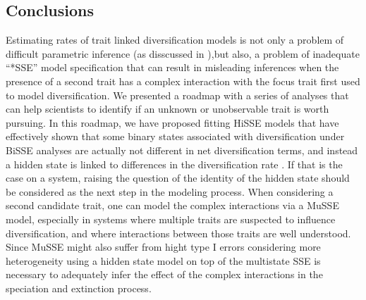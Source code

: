 %


\bigskip

\subsection*{Conclusions}

Estimating rates of trait linked diversification models is not only a problem of difficult parametric inference (as disscussed in  \citet{rabosky_2010, beaulieu_2015}),but also, a problem of inadequate  ``*SSE'' model specification that can result in misleading inferences when the presence of a second trait has a complex interaction with the focus trait first used to model diversification. We presented a roadmap with a series of analyses that can help scientists to identify if an unknown or unobservable trait is worth pursuing. 
In this roadmap, we have proposed fitting HiSSE models that have effectively shown that some binary states associated with diversification under BiSSE analyses are actually not different in net diversification terms, and instead a hidden state is linked to differences in the diversification rate \citep{beaulieu_2016}.  If that is the case on a system, raising the question of the identity of the hidden state should be considered as the next step in the modeling process. When considering  a second candidate trait, one can model the complex interactions via a MuSSE model, especially in systems where multiple traits are suspected to influence diversification, and where interactions between those traits are well understood. 
Since MuSSE might also suffer from hight type I errors considering more heterogeneity using a hidden state model on top of the multistate SSE is necessary to adequately infer the effect of the complex interactions in the speciation and extinction process.


%
%
% 
%
%


